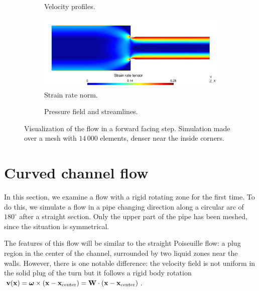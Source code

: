 \documentclass[11 pt]{report}
\begin{document}
\begin{figure}
    \centering
    \begin{subfigure}[t]{\textwidth}
        
        \caption{Velocity profiles.}
        \label{fig:sharpNeckV}
    \end{subfigure}
    \begin{subfigure}[t]{\textwidth}
        \includegraphics[width=\textwidth]{../figures/neck_sharp_strain.pdf}
        \caption{Strain rate norm.}
        \label{fig:sharpNeckS}
    \end{subfigure}
    \begin{subfigure}[t]{\textwidth}
        
        \caption{Pressure field and streamlines.}
        \label{fig:sharpNeckP}
    \end{subfigure}
    \caption{Visualization of the flow in a forward facing step. Simulation made over a mesh with $14\,000$ elements, denser near the inside corners.}
    \label{fig:sharpNeck}
\end{figure}


\section{Curved channel flow}
In this section, we examine a flow with a rigid rotating zone for the first time. To do this, we simulate a flow in a pipe changing direction along a circular arc of $180^\circ$ after a straight section. Only the upper part of the pipe has been meshed, since the situation is symmetrical.

The features of this flow will be similar to the straight Poiseuille flow: a plug region in the center of the channel, surrounded by two liquid zones near the walls. However, there is one notable difference: the velocity field is not uniform in the solid plug of the turn but it follows a rigid body rotation $\mathbf{v}(\mathbf{x}) = \boldsymbol\omega \times (\mathbf{x} - \mathbf{x}_{\text{center}}) = \mathbf{W} \cdot (\mathbf{x} - \mathbf{x}_{\text{center}})$.
\end{document}
